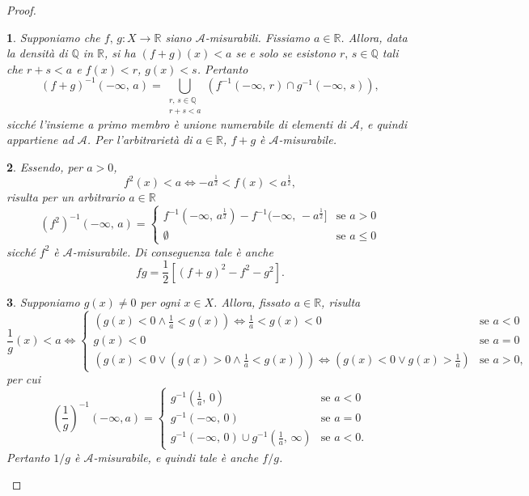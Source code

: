 \documentclass[a4paper,10pt,openright,oneside]{book}
\theoremstyle{theoremstyle}
\theoremstyle{theoremstylewoheader}
\theoremstyle{theoremstyle}
\theoremstyle{proofsecstyle}
\newtheorem{proofsec}{}
\theoremstyle{nonumberplain}
\newtheorem{proof}{Dim.}
\renewcommand{\AA}{\ensuremath{\mathcal{A}}}
\newcommand{\QQ}{\ensuremath{\mathbb{Q}}}
\newcommand{\RR}{\ensuremath{\mathbb{R}}}
\begin{document}
\begin{proof}
\begin{proofsec}
Supponiamo che $f,\, g : X \rightarrow \RR$ siano $\AA$-misurabili. Fissiamo $a \in \RR$. Allora, data la densità di $\QQ$ in $\RR$, si ha $(f+g)(x) < a$ se e solo se esistono $r,\, s \in \QQ$ tali che $r+s < a$ e $f(x) < r$, $g(x) < s$. Pertanto
\[
(f+g)^{-1} (-\infty,\, a) = \bigcup_{\substack{r,\, s\in\QQ\\r+s<a}} (f^{-1}(-\infty,\, r) \cap g^{-1}(-\infty,\, s)),
\]
sicché l'insieme a primo membro è unione \emph{numerabile} di elementi di $\AA$, e quindi appartiene ad $\AA$. Per l'arbitrarietà di $a \in \RR$, $f+g$ è $\AA$-misurabile.
\end{proofsec}

\begin{proofsec}
Essendo, per $a > 0$,
\[
f^2(x) < a \iff -a^\frac{1}{2} < f(x) < a^\frac{1}{2},
\]
risulta per un arbitrario $a \in \RR$
\[
(f^2)^{-1} (-\infty,\, a) = \begin{cases}
f^{-1} (-\infty,\, a^\frac{1}{2}) - f^{-1} (-\infty,\, -a^\frac{1}{2}] & \text{se $a > 0$}\\
\emptyset & \text{se $a \le 0$}
\end{cases}
\]
sicché $f^2$ è $\AA$-misurabile. Di conseguenza tale è anche 
\[
fg = \frac{1}{2} [(f+g)^2 - f^2 - g^2].
\]
\end{proofsec}

\begin{proofsec}
Supponiamo $g(x) \ne 0$ per ogni $x \in X$. Allora, fissato $a \in \RR$, risulta
\[
\frac{1}{g}(x) < a \iff \begin{cases}
\left(g(x)<0 \land \frac{1}{a}<g(x)\right) \iff \frac{1}{a} < g(x) < 0 & \text{se $a < 0$}\\
g(x)<0 & \text{se $a = 0$}\\
\left(g(x)<0 \lor \left(g(x)>0 \land \frac{1}{a} < g(x)\right)\right) \iff \left(g(x)<0 \lor g(x) > \frac{1}{a}\right) & \text{se $a > 0$,}
\end{cases}
\]
per cui
\[
\left(\frac{1}{g}\right)^{-1} (-\infty, a) =
\begin{cases}
g^{-1} (\frac{1}{a},\, 0) & \text{se $a < 0$}\\
g^{-1} (-\infty,\, 0) & \text{se $a = 0$}\\
g^{-1} (-\infty,\, 0) \cup g^{-1} (\frac{1}{a},\, \infty) & \text{se $a < 0$}.
\end{cases}
\]
Pertanto $1/g$ è $\AA$-misurabile, e quindi tale è anche $f/g$.
\end{proofsec}


\end{proof}
\end{document}
